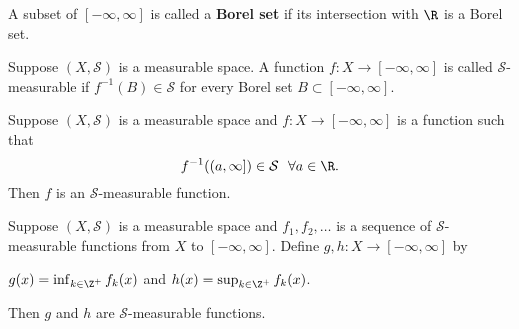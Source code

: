 \begin{definition}
    A subset of \( [- \infty, \infty] \) is called a \textbf{Borel set} if its intersection with \( \R  \) is a Borel set. 
\end{definition}

\begin{definition}
    Suppose \( (X,\mathcal{S}) \) is a measurable space. A function \( f: X \to [-\infty, \infty  ] \) is called \( \mathcal{S} \)-measurable if \( f^{-1}(B) \in \mathcal{S} \) for every Borel set \( B \subset [-\infty ,\infty ] \).
\end{definition}

\begin{prop}
    Suppose \( (X,\mathcal{S}) \) is a measurable space and \( f: X \to [-\infty,\infty ] \) is a function such that 
    \[  f^{-1}((a,\infty]) \in \mathcal{S} \ \ \forall a \in \R. \]
    Then \( f  \) is an \( \mathcal{S} \)-measurable function.
\end{prop}

\begin{prop}
    Suppose \( (X,\mathcal{S}) \) is a measurable space and \( {f}_{1}, {f}_{2}, \dots  \) is a sequence of \( \mathcal{S} \)-measurable functions from \( X  \) to \( [-\infty , \infty ] \). Define \( g,h : X \to [-\infty ,\infty] \) by
    \begin{center}
        \( g(x) = \inf_{k \in \Z^{+}} {f}_{k}(x) \) and \( h(x) = \sup_{k \in \Z^{+}} {f}_{k }(x) \).
    \end{center}
    Then \( g  \) and \( h  \) are \( \mathcal{S}  \)-measurable functions.
\end{prop}
